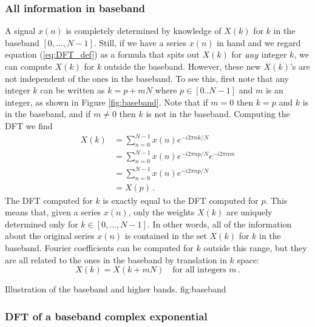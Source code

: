 \documentclass[twocolumn]{article}
\begin{document}
\subsubsection{All information in baseband}

A signal $x(n)$ is completely determined by knowledge of $X(k)$ for $k$ in the baseband $[0,\ldots,N-1]$.
Still, if we have a series $x(n)$ in hand and we regard equation (\ref{eq:DFT_def}) as a formula that spits out $X(k)$ for $\emph{any}$ integer $k$, we can compute $X(k)$ for $k$ outside the baseband.
However, these new $X(k)$'s are not independent of the ones in the baseband.
To see this, first note that any integer $k$ can be written as $k=p+mN$ where $p \in [0..N-1]$ and $m$ is an integer, as shown in Figure \ref{fig:baseband}.
Note that if $m=0$ then $k=p$ and $k$ is in the baseband, and if $m \neq 0$ then $k$ is not in the baseband.
Computing the DFT we find
\begin{align}
X(k) &= \sum_{n=0}^{N-1} x(n) e^{-i2\pi nk/N}\\
&= \sum_{n=0}^{N-1} x(n) e^{-i2\pi np/N} e^{-i2\pi nm} \\
&= \sum_{n=0}^{N-1} x(n)e^{-i2\pi np/N} \\
&= X(p) \, .
\end{align}
The DFT computed for $k$ is exactly equal to the DFT computed for $p$.
This means that, given a series $x(n)$, only the weights $X(k)$ are uniquely determined only for $k \in [0, \ldots , N-1]$.
In other words, all of the information about the original series $x(n)$ is contained in the set $X(k)$ for $k$ in the baseband.
Fourier coefficients can be computed for $k$ outside this range, but they are all related to the ones in the baseband by translation in $k$ space:
\begin{equation}
X(k) = X(k+mN) \quad \textrm{for all integers }m \, . \label{eq:translational_symmetry}
\end{equation}

{Illustration of the baseband and higher bands.}
{fig:baseband}


\subsubsection{DFT of a baseband complex exponential}
\end{document}
